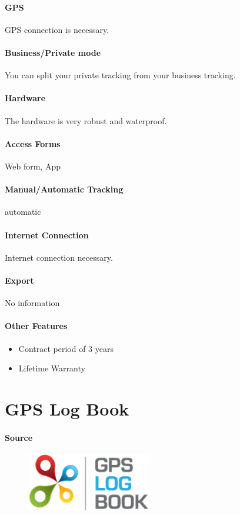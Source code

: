 \paragraph{GPS} GPS connection is necessary.
\paragraph{Business/Private mode} You can split your private tracking from your business tracking.
\paragraph{Hardware}The hardware is very robust and waterproof.
\paragraph{Access Forms}Web form, App
\paragraph{Manual/Automatic Tracking}automatic
\paragraph{Internet Connection}Internet connection necessary.
\paragraph{Export}No information
\paragraph{Other Features} 
\begin{itemize}
\item Contract period of 3 years
\item Lifetime Warranty
\end{itemize}
\newpage

\section{GPS Log Book}
\paragraph{Source} 
\begin{figure}
  \begin{center}
    \includegraphics[width=0.48\textwidth]{GPSlogbook}
  \end{center}
\end{figure}

